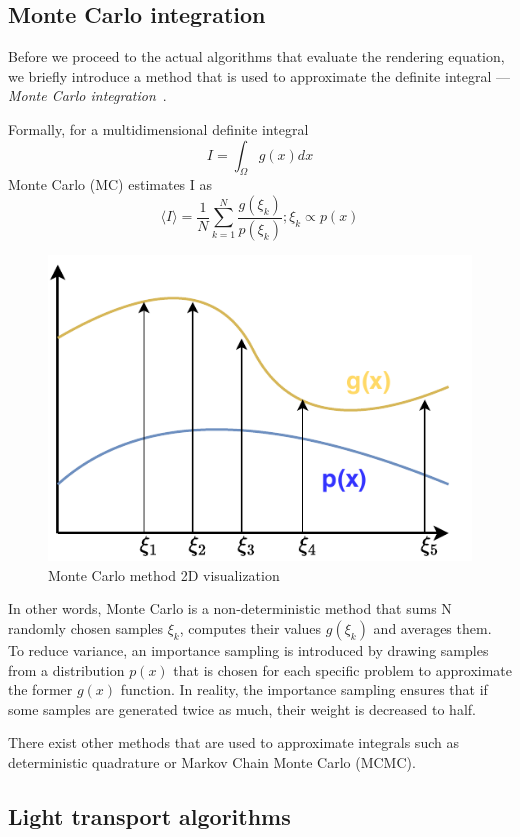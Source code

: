 \subsection{Monte Carlo integration}
Before we proceed to the actual algorithms that evaluate the rendering equation, we briefly introduce a method that is used to approximate the definite integral --- \emph{Monte Carlo integration}~\cite{caflisch1998monte}.

Formally, for a multidimensional definite integral
\begin{equation}
I=\int_{\Omega}g(x)dx
\end{equation}
 Monte Carlo (MC) estimates I as 
 \begin{equation}
 \langle I\rangle=\frac{1}{N}\sum_{k=1}^{N}\frac{g(\xi_k)}{p(\xi_k)}; \xi_k\propto p(x)
 \end{equation}

\begin{figure}[H]
	\centering
	\includegraphics[width=0.5\linewidth]{img/monte_carlo.pdf}
	\caption{Monte Carlo method 2D visualization}
\end{figure}

In other words, Monte Carlo is a non-deterministic method that sums N randomly chosen samples $\xi_k$, computes their values $g(\xi_k)$ and averages them. To reduce variance, an importance sampling is introduced by drawing samples from a distribution $p(x)$ that is chosen for each specific problem to approximate the former $g(x)$ function. In reality, the importance sampling ensures that if some samples are generated twice as much, their weight is decreased to half.

There exist other methods that are used to approximate integrals such as deterministic quadrature or Markov Chain Monte Carlo (MCMC).

\subsection{Light transport algorithms}
\label{sec:light_transport}

